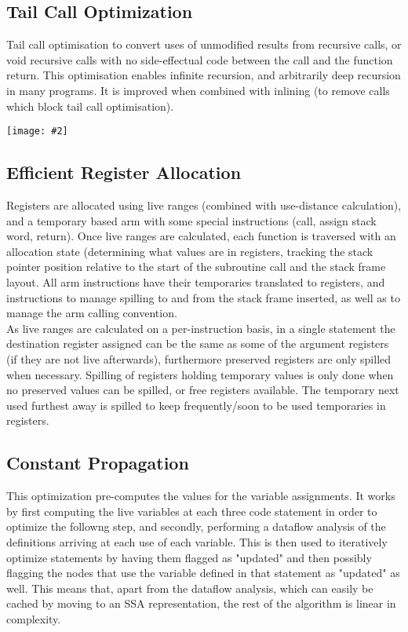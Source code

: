 \documentclass{article}
\newcommand{\centerimage}[2]{\begin{center}
    \texttt{[image: \#2]}
\end{center}}
\begin{document}
        \subsection*{Tail Call Optimization}
        Tail call optimisation to convert uses of unmodified results from recursive calls, or void recursive calls with no side-effectual code between the call and the function return. This optimisation enables infinite recursion, and arbitrarily deep recursion in many programs. It is improved when combined with inlining (to remove calls which block tail call optimisation).
        \centerimage{1}{tail call opt}
        
        \subsection*{Efficient Register Allocation}
        Registers are allocated using live ranges (combined with use-distance calculation), and a temporary based arm with some special instructions (call, assign stack word, return). Once live ranges are calculated, each function is traversed with an allocation state (determining what values are in registers, tracking the stack pointer position relative to the start of the subroutine call and the stack frame layout. All arm instructions have their temporaries translated to registers, and instructions to manage spilling to and from the stack frame inserted, as well as to manage the arm calling convention.
        \\ As live ranges are calculated on a per-instruction basis, in a single statement the destination register assigned can be the same as some of the argument registers (if they are not live afterwards), furthermore preserved registers are only spilled when necessary. Spilling of registers holding temporary values is only done when no preserved values can be spilled, or free registers available. The temporary next used furthest away is spilled to keep frequently/soon to be used temporaries in registers.
        
        \subsection*{Constant Propagation}
        This optimization pre-computes the values for the variable assignments. It works by first computing the live variables at each three code statement in order to optimize the followng step, and secondly, performing a dataflow analysis of the definitions arriving at each use of each variable. This is then used to iteratively optimize statements by having them flagged as "updated" and then possibly flagging the nodes that use the variable defined in that statement as "updated" as well. This means that, apart from the dataflow analysis, which can easily be cached by moving to an SSA representation, the rest of the algorithm is linear in complexity.
        
\end{document}
